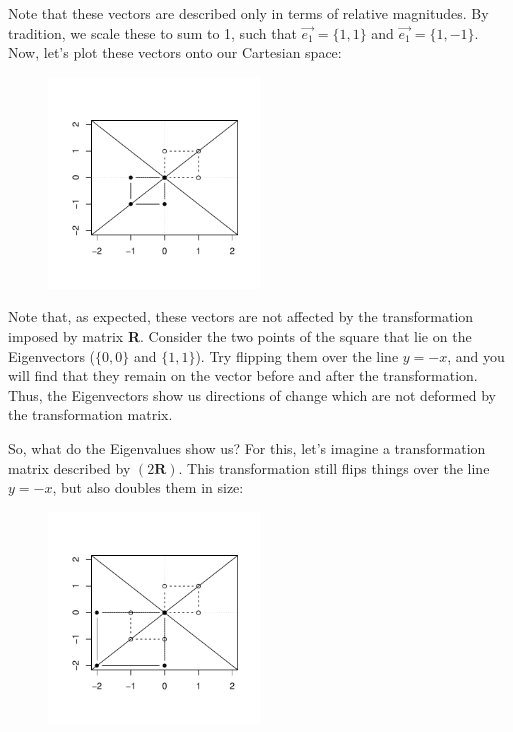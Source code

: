 \documentclass[12pt]{article}
\begin{document}
Note that these vectors are described only in terms of relative magnitudes. By tradition, we scale these to sum to 1, such that $\overrightarrow{e_{1}}=\{1,1\}$ and $\overrightarrow{e_{1}}=\{1,-1\}$. Now, let's plot these vectors onto our Cartesian space:
\begin{figure}[H]
  \centering
  \includegraphics[width=0.5\textwidth, page=1]{figures/Eigen3}
\end{figure}

Note that, as expected, these vectors are not affected by the transformation imposed by matrix \textbf{R}. Consider the two points of the square that lie on the Eigenvectors ($\{0,0\}$ and $\{1,1\}$). Try flipping them over the line $y=-x$, and you will find that they remain on the vector before and after the transformation. Thus, the Eigenvectors show us directions of change which are not deformed by the transformation matrix.

So, what do the Eigenvalues show us? For this, let's imagine a transformation matrix described by $(2\textbf{R})$. This transformation still flips things over the line $y=-x$, but also doubles them in size:
\begin{figure}[H]
  \centering
  \includegraphics[width=0.5\textwidth, page=1]{figures/Eigen4}
\end{figure}
\end{document}
